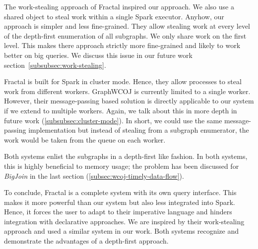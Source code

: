 The work-stealing approach of Fractal inspired our approach.
We also use a shared object to steal work within a single Spark executor.
Anyhow, our approach is simpler and less fine-grained.
They allow stealing work at every level of the depth-first enumeration of all subgraphs.
We only share work on the first level.
This makes there approach strictly more fine-grained and likely to work better on big
queries.
We discuss this issue in our future work section~\ref{subsubsec:work-stealing}.

Fractal is built for Spark in cluster mode.
Hence, they allow processes to steal work from different workers.
GraphWCOJ is currently limited to a single worker.
However, their message-passing based solution is directly applicable to our system if
we extend to multiple workers.
Again, we talk about this in more depth in future work (\ref{subsubsec:cluster-mode}).
In short, we could use the same message-passing implementation but instead of stealing
from a subgraph enumerator, the work would be taken from the queue on each worker.

Both systems enlist the subgraphs in a depth-first like fashion.
In both systems, this is highly beneficial to memory usage;
the problem has been discussed for \textit{BigJoin} in the last section (\ref{subsec:wcoj-timely-data-flow}).


To conclude, Fractal is a complete system with its own query interface.
This makes it more powerful than our system but also less integrated into Spark.
Hence, it forces the user to adapt to their imperative language and hinders
integration with declarative approaches.
We are inspired by their work-stealing approach and used a similar system in our work.
Both systems recognize and demonstrate the advantages of a depth-first approach.


